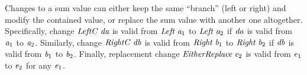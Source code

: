 Changes to a sum value can either keep the same ``branch'' (left or right) and
modify the contained value, or replace the sum value with another one altogether.
Specifically, change \ensuremath{\Conid{LeftC}\;\Varid{da}} is valid from \ensuremath{\Conid{Left}\;\Varid{a}_{1}} to \ensuremath{\Conid{Left}\;\Varid{a}_{2}} if \ensuremath{\Varid{da}} is valid from
\ensuremath{\Varid{a}_{1}} to \ensuremath{\Varid{a}_{2}}. Similarly, change \ensuremath{\Conid{RightC}\;\Varid{db}} is valid from \ensuremath{\Conid{Right}\;\Varid{b}_{1}} to \ensuremath{\Conid{Right}\;\Varid{b}_{2}} if \ensuremath{\Varid{db}} is valid from \ensuremath{\Varid{b}_{1}} to \ensuremath{\Varid{b}_{2}}.
Finally, replacement change \ensuremath{\Conid{EitherReplace}\;\Varid{e}_{2}} is valid from \ensuremath{\Varid{e}_{1}} to \ensuremath{\Varid{e}_{2}} for
any \ensuremath{\Varid{e}_{1}}.

